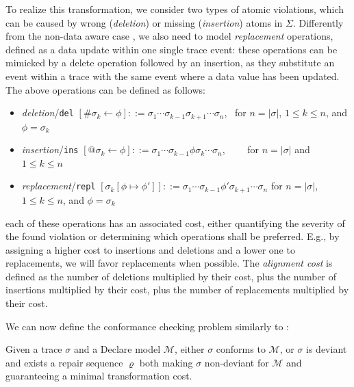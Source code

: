To realize this transformation, we consider two types of atomic violations, which can be caused by wrong (\textit{deletion}) or missing (\textit{insertion}) atoms in $\Sigma$. Differently from the non-data aware case \cite{Moje}, we also need to model \textit{replacement} operations, defined as a data update within one single trace event: these operations can be mimicked by a delete operation followed by an insertion, as they substitute an event within a trace with the same event where a data value has been updated. The above operations can be defined as follows:
\begin{itemize}
	\item \textit{deletion}/\texttt{del} $[\#\sigma_k\leftarrow \phi]::= \sigma_1\cdots\sigma_{k-1}\sigma_{k+1}\cdots \sigma_n$,\,\,\, for $n=|\sigma|$, $1\leq k\leq n$, and $\phi=\sigma_k$
	\item \textit{insertion}/\texttt{ins} $[@\sigma_k\leftarrow \phi]::= \sigma_1\cdots\sigma_{k-1}\phi\sigma_{k}\cdots \sigma_n$,\,\,\,\,\,\,\,\,\,\,\,\, for $n=|\sigma|$ and $1\leq k\leq n$
	\item \textit{replacement}/\texttt{repl} $[\sigma_k[\phi\mapsto\phi']]::=\sigma_1\cdots \sigma_{k-1}\phi'\sigma_{k+1}\cdots\sigma_n$ for $n=|\sigma|$, $1\leq k\leq n$, and $\phi=\sigma_k$
\end{itemize}
 each of these operations has an associated cost, either quantifying the severity of the found violation or determining which operations shall be preferred. E.g., by assigning a higher cost to insertions and deletions and a lower one to replacements, we will favor replacements when possible. The \textit{alignment cost} is defined as the number of deletions multiplied by their cost, plus the number of insertions multiplied by their cost, plus the number of replacements multiplied by their cost.

We can now define the conformance checking problem similarly to \cite{Moje}:
\begin{definition}
Given a trace $\sigma$ and a Declare model $\mathcal{M}$, either $\sigma$ conforms to $\mathcal{M}$, or $\sigma$ is deviant and  exists a repair sequence $\varrho$ both making $\sigma$ non-deviant for $\mathcal{M}$ and guaranteeing a minimal transformation cost.
\end{definition}

